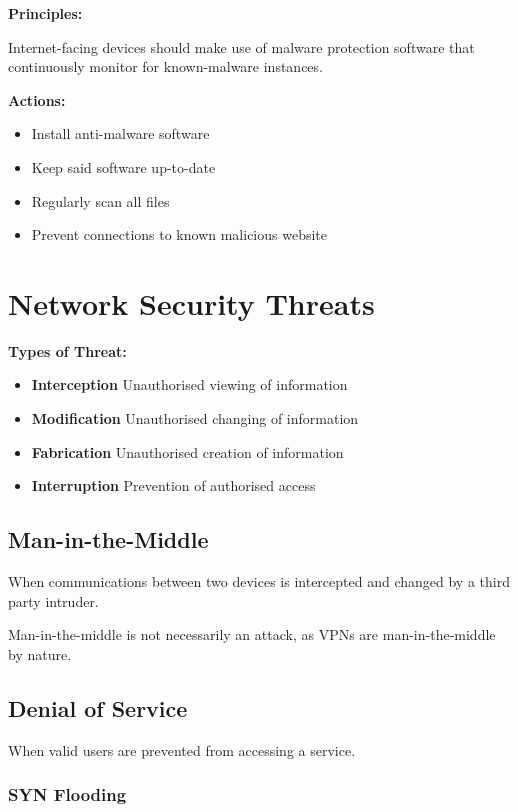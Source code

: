 \documentclass{article}
\begin{document}
\textbf{Principles:}

Internet-facing devices should make use of malware protection software that continuously monitor for known-malware instances.

\textbf{Actions:}

\begin{itemize}
\item 
  Install anti-malware software
\item 
  Keep said software up-to-date
\item 
  Regularly scan all files
\item 
  Prevent connections to known malicious website
\end{itemize}

\section{Network Security Threats}

\textbf{Types of Threat:}
\begin{itemize}
\item 
  \textbf{Interception}
  \subitem
  Unauthorised viewing of information
\item 
  \textbf{Modification}
  \subitem
  Unauthorised changing of information
\item 
  \textbf{Fabrication}
  \subitem
  Unauthorised creation of information
\item 
  \textbf{Interruption}
  \subitem
  Prevention of authorised access
\end{itemize}

\subsection{Man-in-the-Middle}

When communications between two devices is intercepted and changed by a third party intruder.

Man-in-the-middle is not necessarily an attack, as VPNs are man-in-the-middle by nature.

\subsection{Denial of Service}

When valid users are prevented from accessing a service.

\subsubsection{SYN Flooding}
\end{document}
